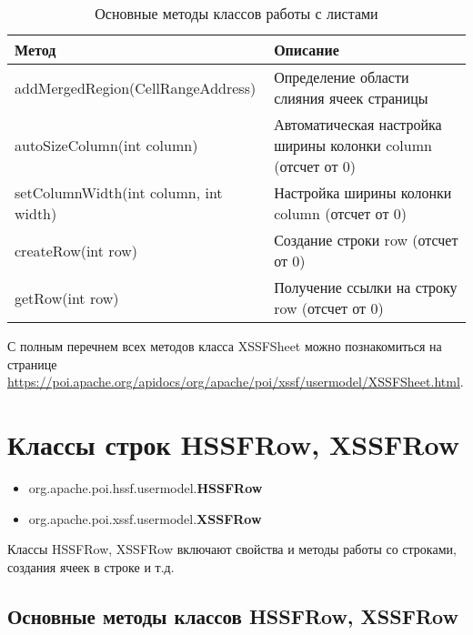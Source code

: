 \begin{table}[h!]
	\begin{center}
		\caption{Основные методы классов работы с листами}
		\label{tab:listOfComponentsWithList}
		\begin{tabular}{l|l}
			\textbf{Метод} & \textbf{Описание} \\
			\hline
			addMergedRegion(CellRangeAddress) & Определение области слияния ячеек страницы \\
			autoSizeColumn(int column) & Автоматическая настройка ширины колонки column (отсчет от 0) \\
			setColumnWidth(int column, int width)  & Настройка ширины колонки column (отсчет от 0) \\ 
			createRow(int row) & Создание строки row (отсчет от 0) \\
			getRow(int row) & Получение ссылки на строку row (отсчет от 0) \\
		\end{tabular}
	\end{center}
\end{table}

С полным перечнем всех методов класса XSSFSheet можно познакомиться на странице\\ \href{https://poi.apache.org/apidocs/org/apache/poi/xssf/usermodel/XSSFSheet.html}{https://poi.apache.org/apidocs/org/apache/poi/xssf/usermodel/XSSFSheet.html}.

\section{Классы строк HSSFRow, XSSFRow}

\begin{itemize}
	\item org.apache.poi.hssf.usermodel.\textbf{HSSFRow}
	\item  org.apache.poi.xssf.usermodel.\textbf{XSSFRow}
\end{itemize}

Классы HSSFRow, XSSFRow включают свойства и методы работы со строками, создания ячеек в строке и т.д.

\subsection{Основные методы классов HSSFRow, XSSFRow}

